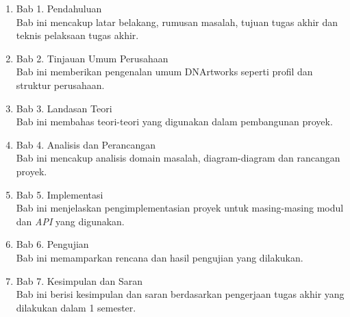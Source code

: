 \begin{enumerate}
	\item Bab 1. Pendahuluan\\
	Bab ini mencakup latar belakang, rumusan masalah, tujuan tugas akhir dan teknis pelaksaan tugas akhir.
	\item Bab 2. Tinjauan Umum Perusahaan\\
	Bab ini memberikan pengenalan umum DNArtworks seperti profil dan struktur perusahaan.
	\item Bab 3. Landasan Teori\\
	Bab ini membahas teori-teori yang digunakan dalam pembangunan proyek.
	\item Bab 4. Analisis dan Perancangan\\
	Bab ini mencakup analisis domain masalah, diagram-diagram dan rancangan proyek.
	\item Bab 5. Implementasi\\
	Bab ini menjelaskan pengimplementasian proyek untuk masing-masing modul dan \textit{API} yang digunakan.
	\item Bab 6. Pengujian\\
	Bab ini memamparkan rencana dan hasil pengujian yang dilakukan.
	\item Bab 7. Kesimpulan dan Saran\\
	Bab ini berisi kesimpulan dan saran berdasarkan pengerjaan tugas akhir yang dilakukan dalam 1 semester.

\end{enumerate}
